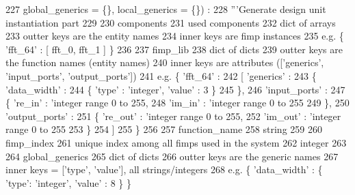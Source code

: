 \begin{DoxyCode}
227   global\_generics = \{\}, local\_generics = \{\}) :
228   \textcolor{stringliteral}{'''Generate design unit instantiation part}
229 \textcolor{stringliteral}{}
230 \textcolor{stringliteral}{    components}
231 \textcolor{stringliteral}{      used components}
232 \textcolor{stringliteral}{      dict of arrays}
233 \textcolor{stringliteral}{      outter keys are the entity names}
234 \textcolor{stringliteral}{      inner keys are fimp instances}
235 \textcolor{stringliteral}{      e.g. \{ 'fft\_64' : [ fft\_0, fft\_1 ] \}}
236 \textcolor{stringliteral}{}
237 \textcolor{stringliteral}{    fimp\_lib}
238 \textcolor{stringliteral}{      dict of dicts}
239 \textcolor{stringliteral}{      outter keys are the function names (entity names)}
240 \textcolor{stringliteral}{      inner keys are attributes (['generics', 'input\_ports', 'output\_ports'])}
241 \textcolor{stringliteral}{      e.g. \{ 'fft\_64' :}
242 \textcolor{stringliteral}{             [ 'generics' :}
243 \textcolor{stringliteral}{               \{ 'data\_width' :}
244 \textcolor{stringliteral}{                 \{ 'type' : 'integer', 'value' : 3 \}}
245 \textcolor{stringliteral}{               \},}
246 \textcolor{stringliteral}{               'input\_ports' :}
247 \textcolor{stringliteral}{               \{ 're\_in' : 'integer range 0 to 255,}
248 \textcolor{stringliteral}{                 'im\_in' : 'integer range 0 to 255}
249 \textcolor{stringliteral}{               \},}
250 \textcolor{stringliteral}{               'output\_ports' :}
251 \textcolor{stringliteral}{               \{ 're\_out' : 'integer range 0 to 255,}
252 \textcolor{stringliteral}{                 'im\_out' : 'integer range 0 to 255}
253 \textcolor{stringliteral}{               \}}
254 \textcolor{stringliteral}{             ]}
255 \textcolor{stringliteral}{           \}}
256 \textcolor{stringliteral}{}
257 \textcolor{stringliteral}{    function\_name}
258 \textcolor{stringliteral}{      string}
259 \textcolor{stringliteral}{}
260 \textcolor{stringliteral}{    fimp\_index}
261 \textcolor{stringliteral}{      unique index among all fimps used in the system}
262 \textcolor{stringliteral}{      integer}
263 \textcolor{stringliteral}{}
264 \textcolor{stringliteral}{    global\_generics}
265 \textcolor{stringliteral}{      dict of dicts}
266 \textcolor{stringliteral}{      outter keys are the generic names}
267 \textcolor{stringliteral}{      inner keys = ['type', 'value'], all strings/integers}
268 \textcolor{stringliteral}{      e.g. \{ 'data\_width' : \{ 'type': 'integer', 'value' : 8 \} \}}

\end{DoxyCode}
